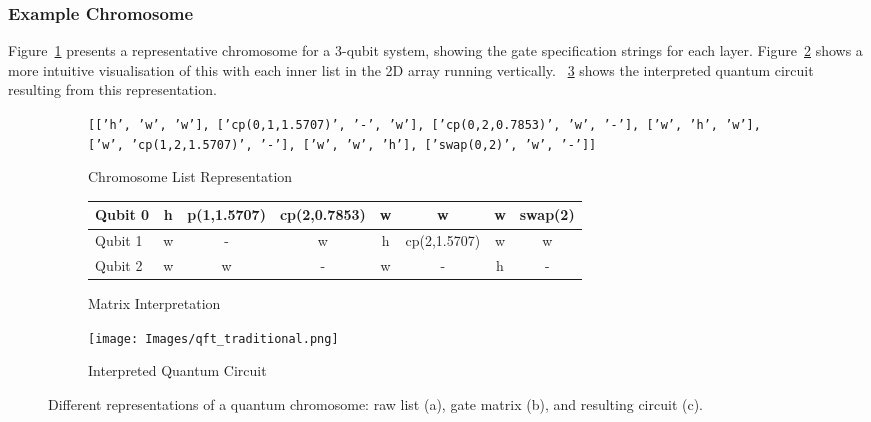 \documentclass[11pt,a4paper]{article}
\begin{document}
\subsubsection*{Example Chromosome} Figure~\ref{fig:chromosome_list} presents a representative chromosome for a 3-qubit system, showing the gate specification strings for each layer. Figure~\ref{fig:chromosome_matrix} shows a more intuitive visualisation of this with each inner list in the 2D array running vertically. ~\ref{fig:chromosome_circuit} shows the interpreted quantum circuit resulting from this representation.

\begin{figure}[H]
    \centering

    \begin{subfigure}[b]{0.9\textwidth}
        \centering
        \texttt{[['h', 'w', 'w'], ['cp(0,1,1.5707)', '-', 'w'], ['cp(0,2,0.7853)', 'w', '-'], ['w', 'h', 'w'], 
        ['w', 'cp(1,2,1.5707)', '-'], ['w', 'w', 'h'], ['swap(0,2)', 'w', '-']]}
        \caption{Chromosome List Representation}
        \label{fig:chromosome_list}
    \end{subfigure}

    \vspace{1em}

    \begin{subfigure}[b]{0.65\textwidth}
        \centering
        \small
        \begin{tabular}{l | c c c c c c c}
            \toprule
            Qubit 0 & h & p(1,1.5707) & cp(2,0.7853) & w & w & w & swap(2) \\
            \midrule
            Qubit 1 & w & - & w & h & cp(2,1.5707) & w & w \\
            \midrule
            Qubit 2 & w & w & - & w & - & h & - \\
            \bottomrule
        \end{tabular}
        \caption{Matrix Interpretation}
        \label{fig:chromosome_matrix}
    \end{subfigure}

    \vspace{1em}

    \begin{subfigure}[b]{0.6\textwidth}
        \centering
        \texttt{[image: Images/qft\_traditional.png]}
        \caption{Interpreted Quantum Circuit}
        \label{fig:chromosome_circuit}
    \end{subfigure}

    \caption{Different representations of a quantum chromosome: raw list (a), gate matrix (b), and resulting circuit (c).}
    \label{fig:chromosome_representations}
\end{figure}\newpage
\end{document}
